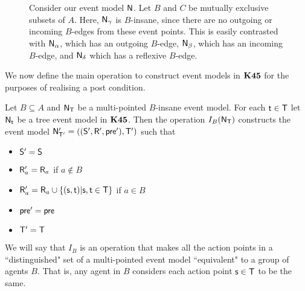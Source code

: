 \begin{figure}[ht!]
\centering
{}
\caption{Consider our event model $\mathrm{\mathsf{N}}$. Let $B$ and $C$ be mutually exclusive
  subsets of $A$. Here, $\mathrm{\mathsf{N}}_\gamma$
  is $B$-insane, since there are no outgoing or incoming $B$-edges from these event points.
This is easily contrasted with $\mathrm{\mathsf{N}}_\alpha$, which has an outgoing $B$-edge, $\mathrm{\mathsf{N}}_\beta$, which
has an incoming $B$-edge, and $\mathrm{\mathsf{N}}_\delta$ which has a reflexive $B$-edge.}
\label{bInsaneExample}
\end{figure}

We now define the main operation to construct event models in $\bf K45$ for the
purposes of realising a post condition.

\begin{defn} \label{makeEquivalence}
	Let $B \subseteq A$ and $\mathrm{\mathsf{N}}_\mathrm{\mathsf{T}}$ be a multi-pointed $B$-insane event model.
  For each $\mathrm{\mathsf{t}} \in \mathrm{\mathsf{T}}$ let $\mathrm{\mathsf{N}}_\mathrm{\mathsf{t}}$ be a tree event model in $\bf K45$.
  Then the operation $I_B(\mathrm{\mathsf{N}}_\mathrm{\mathsf{T}})$ constructs the event model $\mathrm{\mathsf{N}}'_{\mathrm{\mathsf{T}}'} =
  ((\mathrm{\mathsf{S}}',\mathrm{\mathsf{R}}',\mathrm{\mathsf{pre}}'),\mathrm{\mathsf{T}}')$ such that
  \begin{itemize}
    \item $\mathrm{\mathsf{S}}' = \mathrm{\mathsf{S}}$
    \item $\mathrm{\mathsf{R}}'_a = \mathrm{\mathsf{R}}_a$ if $a \notin B$
    \item $\mathrm{\mathsf{R}}'_a = \mathrm{\mathsf{R}}_a \cup \{(\mathrm{\mathsf{s}}, \mathrm{\mathsf{t}}) | \mathrm{\mathsf{s}}, \mathrm{\mathsf{t}} \in \mathrm{\mathsf{T}}\}$ if $a
    \in B$
    \item $\mathrm{\mathsf{pre}}' = \mathrm{\mathsf{pre}}$
    \item $\mathrm{\mathsf{T}}' = \mathrm{\mathsf{T}}$
  \end{itemize}
\end{defn}

We will say that $I_B$ is an operation that makes all the action
points in a ``distinguished" set of a multi-pointed event model ``equivalent" to a
group of agents $B$.
That is, any agent in $B$ considers each action point $\mathrm{\mathsf{s}} \in \mathrm{\mathsf{T}}$ to be the
same.

